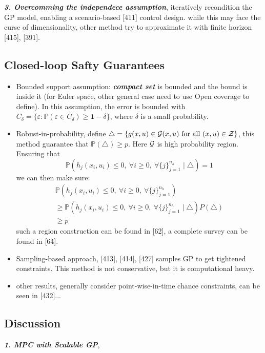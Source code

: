 \documentclass[10pt]{elegantbook}
\newcommand{\mydefination}[1]{\textbf{\textit{\textcolor{structurecolor}{#1}}}}
\begin{document}
\mydefination{3. Overcomming the independece assumption}, iteratively recondition the GP model, enabling a
scenario-based [411] control design. while this may face the curse of dimensionality, other method try to approximate it 
with finite horizon [415], [391].

\subsection{Closed-loop Safty Guarantees}
\begin{itemize}
    \item Bounded support assumption: \mydefination{compact set} is bounded and the bound is inside it (for Euler space, other 
    general case need to use Open coverage to define). In this assumption, the error is bounded with 
    $C_{\delta}=\{\varepsilon:\mathbb{P}(\varepsilon\in C_{\delta})\geq{\mathbf{1}}-\delta\}$, where $\delta$ is a small 
    probability.
    \item Robust-in-probability, define $\triangle=\left\{g(x,u)\in{\cal G}(x,u) \mathrm{~ for ~ all ~} (x,u)\in\mathcal{Z}\right\}$,
    this method guarantee that $\mathbb P(\triangle) \geq p$. Here $\cal G$ is high probability region. Ensuring that 
    \[ \mathbb{P}(h_{j}(x_{i},u_{i})\leq0, ~ \forall i\geq0, ~ \forall\{j\}_{j=1}^{n_{h}}\mid\triangle)=1 \]
    we can then make sure:
    \[
    \begin{array}{l}
        \mathbb{P}(h_{j}(x_{i},u_{i})\leq0, ~ \forall i\geq0, ~ \forall\{j\}_{j=1}^{n_{h}}) \\
        \geq \mathbb{P}(h_{j}(x_{i},u_{i})\leq0, ~ \forall i\geq0, ~ \forall\{j\}_{j=1}^{n_{h}}\mid\triangle) P(\triangle) \\
        \geq p
    \end{array}
    \]
    such a region construction can be found in [62], a complete survey can be found in [64].
    \item Sampling-based approach, [413], [414], [427] samples GP to get tightened constraints. This method is not conservative,
but it is computational heavy.
    \item other results, generally consider point-wise-in-time chance constraints, can be seen in [432]...
\end{itemize}

\subsection{Discussion}
\mydefination{1. MPC with Scalable GP}, 
\end{document}
